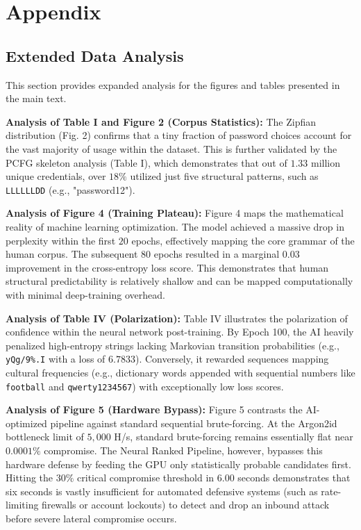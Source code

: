 \documentclass[conference]{IEEEtran}
\begin{document}
\section*{Appendix}

\subsection{Extended Data Analysis}
This section provides expanded analysis for the figures and tables presented in the main text.

\textbf{Analysis of Table I and Figure 2 (Corpus Statistics):} The Zipfian distribution (Fig. 2) confirms that a tiny fraction of password choices account for the vast majority of usage within the dataset. This is further validated by the PCFG skeleton analysis (Table I), which demonstrates that out of $1.33$ million unique credentials, over $18\%$ utilized just five structural patterns, such as \texttt{LLLLLLDD} (e.g., "password12").

\textbf{Analysis of Figure 4 (Training Plateau):} Figure 4 maps the mathematical reality of machine learning optimization. The model achieved a massive drop in perplexity within the first $20$ epochs, effectively mapping the core grammar of the human corpus. The subsequent $80$ epochs resulted in a marginal $0.03$ improvement in the cross-entropy loss score. This demonstrates that human structural predictability is relatively shallow and can be mapped computationally with minimal deep-training overhead.

\textbf{Analysis of Table IV (Polarization):} Table IV illustrates the polarization of confidence within the neural network post-training. By Epoch 100, the AI heavily penalized high-entropy strings lacking Markovian transition probabilities (e.g., \texttt{yQg/9\%.I} with a loss of $6.7833$). Conversely, it rewarded sequences mapping cultural frequencies (e.g., dictionary words appended with sequential numbers like \texttt{football} and \texttt{qwerty1234567}) with exceptionally low loss scores.

\textbf{Analysis of Figure 5 (Hardware Bypass):} Figure 5 contrasts the AI-optimized pipeline against standard sequential brute-forcing. At the Argon2id bottleneck limit of $5,000$ H/s, standard brute-forcing remains essentially flat near $0.0001\%$ compromise. The Neural Ranked Pipeline, however, bypasses this hardware defense by feeding the GPU only statistically probable candidates first. Hitting the $30\%$ critical compromise threshold in $6.00$ seconds demonstrates that six seconds is vastly insufficient for automated defensive systems (such as rate-limiting firewalls or account lockouts) to detect and drop an inbound attack before severe lateral compromise occurs.
\end{document}
